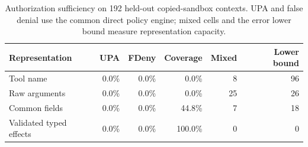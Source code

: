 \begin{table}[t]
\centering
\small
\caption{Authorization sufficiency on 192 held-out copied-sandbox contexts. UPA and false denial use the common direct policy engine; mixed cells and the error lower bound measure representation capacity.}
\label{tab:full-deployment-authz}
\begin{tabular}{lrrrrr}
\toprule
Representation & UPA & FDeny & Coverage & Mixed & Lower bound \\
\midrule
Tool name & 0.0\% & 0.0\% & 0.0\% & 8 & 96 \\
Raw arguments & 0.0\% & 0.0\% & 0.0\% & 25 & 26 \\
Common fields & 0.0\% & 0.0\% & 44.8\% & 7 & 18 \\
Validated typed effects & 0.0\% & 0.0\% & 100.0\% & 0 & 0 \\
\bottomrule
\end{tabular}
\end{table}
